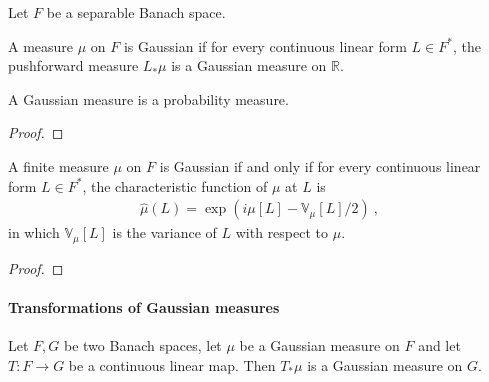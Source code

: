 Let $F$ be a separable Banach space.

\begin{definition}\label{def:IsGaussian}
  \mathlibok
A measure $\mu$ on $F$ is Gaussian if for every continuous linear form $L \in F^*$, the pushforward measure $L_* \mu$ is a Gaussian measure on $\mathbb{R}$.
\end{definition}


\begin{lemma}\label{lem:IsGaussian.IsProbabilityMeasure}
  \mathlibok
A Gaussian measure is a probability measure.
\end{lemma}

\begin{proof}\leanok

\end{proof}


\begin{theorem}\label{thm:isGaussian_iff_charFunDual_eq}
  \mathlibok
A finite measure $\mu$ on $F$ is Gaussian if and only if for every continuous linear form $L \in F^*$, the characteristic function of $\mu$ at $L$ is
\begin{align*}
  \hat{\mu}(L) = \exp\left(i \mu[L] - \mathbb{V}_\mu[L] / 2\right) \: ,
\end{align*}
in which $\mathbb{V}_\mu[L]$ is the variance of $L$ with respect to $\mu$.
\end{theorem}

\begin{proof}\leanok

\end{proof}



\paragraph{Transformations of Gaussian measures}

\begin{lemma}\label{lem:isGaussian_map}
  \mathlibok
Let $F, G$ be two Banach spaces, let $\mu$ be a Gaussian measure on $F$ and let $T : F \to G$ be a continuous linear map.
Then $T_*\mu$ is a Gaussian measure on $G$.
\end{lemma}

